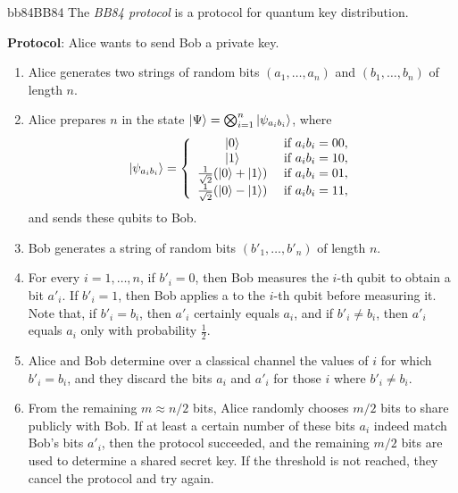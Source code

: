 \begin{topic}{bb84}{BB84}
    The \emph{BB84 protocol} is a protocol for quantum key distribution.

    \textbf{Protocol}: Alice wants to send Bob a private key.

    \begin{enumerate}[label=(\arabic*)]
        \item Alice generates two strings of random bits $(a_1, \ldots, a_n)$ and $(b_1, \ldots, b_n)$ of length $n$.
        \item Alice prepares $n$  in the state $|\Psi\rangle = \bigotimes_{i = 1}^{n} |\psi_{a_i b_i}\rangle$, where
        \[ |\psi_{a_i b_i}\rangle = \left\{ \begin{array}{cl}
            |0\rangle & \textup{ if } a_i b_i = 00 , \\
            |1\rangle & \textup{ if } a_i b_i = 10 , \\
            \tfrac{1}{\sqrt{2}} ( |0\rangle + |1\rangle ) & \textup{ if } a_i b_i = 01 , \\
            \tfrac{1}{\sqrt{2}} ( |0\rangle - |1\rangle ) & \textup{ if } a_i b_i = 11 ,
        \end{array} \right. \]
        and sends these qubits to Bob.
        \item Bob generates a string of random bits $(b'_1, \ldots, b'_n)$ of length $n$.
        \item For every $i = 1, \ldots, n$, if $b'_i = 0$, then Bob measures the $i$-th qubit to obtain a bit $a'_i$. If $b'_i = 1$, then Bob applies a  to the $i$-th qubit before measuring it. Note that, if $b'_i = b_i$, then $a'_i$ certainly equals $a_i$, and if $b'_i \ne b_i$, then $a'_i$ equals $a_i$ only with probability $\tfrac{1}{2}$.
        \item Alice and Bob determine over a classical channel the values of $i$ for which $b'_i = b_i$, and they discard the bits $a_i$ and $a'_i$ for those $i$ where $b'_i \ne b_i$.
        \item From the remaining $m \approx n / 2$ bits, Alice randomly chooses $m / 2$ bits to share publicly with Bob. If at least a certain number of these bits $a_i$ indeed match Bob's bits $a'_i$, then the protocol succeeded, and the remaining $m / 2$ bits are used to determine a shared secret key. If the threshold is not reached, they cancel the protocol and try again.
    \end{enumerate}
\end{topic}
